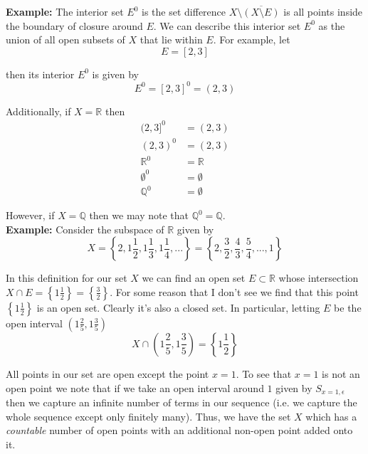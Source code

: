 \documentclass[12pt]{article}
\newlength\tindent
\renewcommand{\indent}{\hspace*{\tindent}}
\newcommand{\R}{\mathbb R}
\newcommand{\Q}{\mathbb Q}
\begin{document}
%
%
{\bf Example:} The interior set $E^0$ is the set difference $X\setminus\overline{\left( X\setminus E\right)}$ is all points inside the boundary of closure around $E$. We can describe this interior set $E^0$ as the union of all open subsets of $X$ that lie within $E$. For example, let
\begin{equation*}
	E = [2, 3]
\end{equation*}

then its interior $E^0$ is given by
\begin{equation*}
	E^0 = [2, 3]^0 = (2, 3)
\end{equation*}

Additionally, if $X = \R$ then
\begin{align*}
	(2, 3]^0 &= (2, 3) \\
	(2, 3)^0 &= (2, 3) \\
	\R^0 &= \R \\
	\emptyset^0 &= \emptyset \\
	\Q^0 &= \emptyset
\end{align*}

However, if $X = \Q$ then we may note that $\Q^0 = \Q$. \\

%
% 
{\bf Example:} Consider the subspace of $\R$ given by
\begin{equation*}
	X = \left\{2, 1\frac{1}{2}, 1\frac{1}{3}, 1\frac{1}{4}, ... \right\} = \left\{2, \frac{3}{2}, \frac{4}{3}, \frac{5}{4}, ... , 1\right\}
\end{equation*}

\indent In this definition for our set $X$ we can find an open set $E \subset \R$ whose intersection $X \cap E = \left\{ 1\frac{1}{2} \right\} = \left\{ \frac{3}{2} \right\}$. For some reason that I don't see we find that this point $\left\{ 1\frac{1}{2} \right\}$ is an open set. Clearly it's also a closed set. In particular, letting $E$ be the open interval $\left(1\frac{2}{5},1\frac{3}{5}\right)$
\begin{equation*}
	X \cap \left(1\frac{2}{5}, 1\frac{3}{5}\right) = \left\{ 1\frac{1}{2} \right\}
\end{equation*}

\indent All points in our set are open except the point $x = 1$. To see that $x = 1$ is not an open point we note that if we take an open interval around $1$ given by $S_{x = 1, \epsilon}$ then we capture an infinite number of terms in our sequence (i.e. we capture the whole sequence except only finitely many). Thus, we have the set $X$ which has a {\em countable} number of open points with an additional non-open point added onto it. \\
\end{document}
